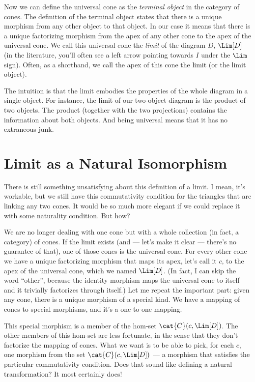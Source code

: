 Now we can define the universal cone as the \emph{terminal object} in
the category of cones. The definition of the terminal object states that
there is a unique morphism from any other object to that object. In our
case it means that there is a unique factorizing morphism from the apex
of any other cone to the apex of the universal cone. We call this
universal cone the \emph{limit} of the diagram $D$, $\Lim[D]$ (in
the literature, you'll often see a left arrow pointing towards $I$
under the $\Lim$ sign). Often, as a shorthand, we call the apex of
this cone the limit (or the limit object).

The intuition is that the limit embodies the properties of the whole
diagram in a single object. For instance, the limit of our two-object
diagram is the product of two objects. The product (together with the
two projections) contains the information about both objects. And being
universal means that it has no extraneous junk.

\section{Limit as a Natural Isomorphism}

There is still something unsatisfying about this definition of a limit.
I mean, it's workable, but we still have this commutativity condition
for the triangles that are linking any two cones. It would be so much
more elegant if we could replace it with some naturality condition. But
how?

We are no longer dealing with one cone but with a whole collection (in
fact, a category) of cones. If the limit exists (and --- let's make it
clear --- there's no guarantee of that), one of those cones is the
universal cone. For every other cone we have a unique factorizing
morphism that maps its apex, let's call it $c$, to the apex of
the universal cone, which we named $\Lim[D]$. (In fact, I can skip
the word ``other'', because the identity morphism maps the universal
cone to itself and it trivially factorizes through itself.) Let me
repeat the important part: given any cone, there is a unique morphism of
a special kind. We have a mapping of cones to special morphisms, and
it's a one-to-one mapping.

This special morphism is a member of the hom-set $\cat{C}(c, \Lim[D])$.
The other members of this hom-set are less fortunate, in the sense that
they don't factorize the mapping of cones. What we want is to be able to
pick, for each $c$, one morphism from the set
$\cat{C}(c, \Lim[D])$ --- a morphism that satisfies the particular
commutativity condition. Does that sound like defining a natural
transformation? It most certainly does!

